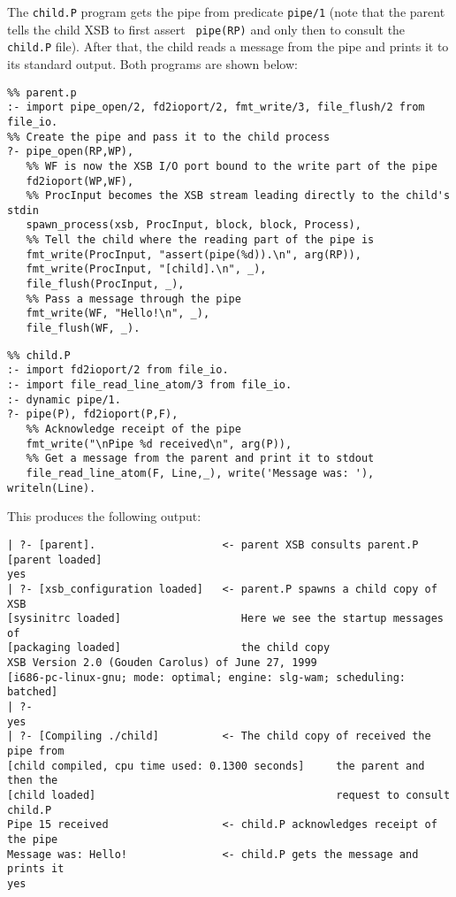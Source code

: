\begin{description}
    The {\tt child.P} program gets the pipe from predicate {\tt pipe/1}
    (note that the parent tells the child XSB to first assert {\tt
    pipe(RP)} and only then to consult the {\tt child.P} file).
  After that, the child reads a message from the pipe and prints it to its
    standard output. Both programs are shown below:
    \begin{verbatim}
%% parent.p      
:- import pipe_open/2, fd2ioport/2, fmt_write/3, file_flush/2 from file_io.
%% Create the pipe and pass it to the child process
?- pipe_open(RP,WP),
   %% WF is now the XSB I/O port bound to the write part of the pipe
   fd2ioport(WP,WF),
   %% ProcInput becomes the XSB stream leading directly to the child's stdin
   spawn_process(xsb, ProcInput, block, block, Process),
   %% Tell the child where the reading part of the pipe is
   fmt_write(ProcInput, "assert(pipe(%d)).\n", arg(RP)),
   fmt_write(ProcInput, "[child].\n", _),
   file_flush(ProcInput, _),
   %% Pass a message through the pipe
   fmt_write(WF, "Hello!\n", _),
   file_flush(WF, _).
    \end{verbatim}
    \begin{verbatim}
%% child.P
:- import fd2ioport/2 from file_io.
:- import file_read_line_atom/3 from file_io.
:- dynamic pipe/1.
?- pipe(P), fd2ioport(P,F),
   %% Acknowledge receipt of the pipe
   fmt_write("\nPipe %d received\n", arg(P)),
   %% Get a message from the parent and print it to stdout
   file_read_line_atom(F, Line,_), write('Message was: '), writeln(Line).
    \end{verbatim}
    This produces the following output:
    \begin{verbatim}
| ?- [parent].                    <- parent XSB consults parent.P
[parent loaded]
yes
| ?- [xsb_configuration loaded]   <- parent.P spawns a child copy of XSB
[sysinitrc loaded]                   Here we see the startup messages of
[packaging loaded]                   the child copy
XSB Version 2.0 (Gouden Carolus) of June 27, 1999
[i686-pc-linux-gnu; mode: optimal; engine: slg-wam; scheduling: batched]
| ?- 
yes
| ?- [Compiling ./child]          <- The child copy of received the pipe from
[child compiled, cpu time used: 0.1300 seconds]     the parent and then the
[child loaded]                                      request to consult child.P
Pipe 15 received                  <- child.P acknowledges receipt of the pipe
Message was: Hello!               <- child.P gets the message and prints it
yes       
    \end{verbatim}
    

\end{description}
